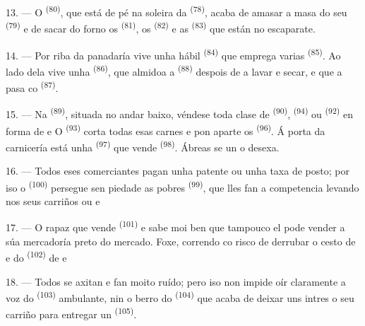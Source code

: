 13. --- O  \textsuperscript{(80)}, que está de pé na soleira da
 \textsuperscript{(78)}, acaba de amasar a masa do seu 
\textsuperscript{(79)} e de sacar do forno os 
\textsuperscript{(81)}, os  \textsuperscript{(82)} e as 
\textsuperscript{(83)} que están no escaparate.

14. --- Por riba da panadaría vive unha hábil 
\textsuperscript{(84)} que emprega varias  \textsuperscript{(85)}.
Ao lado dela vive unha  \textsuperscript{(86)}, que
almidoa a  \textsuperscript{(88)} despois de a lavar e secar, e
que a pasa co  \textsuperscript{(87)}.

\VUsaut{4.0mm}
\VUsaut{3.0mm}

15. --- Na  \textsuperscript{(89)}, situada no andar baixo,
véndese toda clase de  \textsuperscript{(90)},
 \textsuperscript{(94)} ou 
\textsuperscript{(92)} en forma de  e
 O  \textsuperscript{(93)} corta todas
esas carnes e pon aparte os  \textsuperscript{(96)}. Á porta da
carnicería está unha  \textsuperscript{(97)} que vende
 \textsuperscript{(98)}. Ábreas se un o desexa.

16. --- Todos eses comerciantes pagan unha patente ou unha taxa de posto; por iso o
 \textsuperscript{(100)} persegue sen piedade as pobres
 \textsuperscript{(99)}, que lles fan a
competencia levando nos seus carriños  ou
 e

\VUsaut{4.0mm}
\VUsaut{3.0mm}

17. --- O rapaz que vende  \textsuperscript{(101)} e 
sabe moi ben que tampouco el pode vender a súa mercadoría preto do mercado. Foxe,
correndo co risco de derrubar o cesto de   e
 do  \textsuperscript{(102)} de  e

18. --- Todos se axitan e fan moito ruído; pero iso non impide oír claramente a voz do
 \textsuperscript{(103)} ambulante, nin o berro do 
\textsuperscript{(104)} que acaba de deixar uns intres o seu carriño para entregar un
 \textsuperscript{(105)}.
